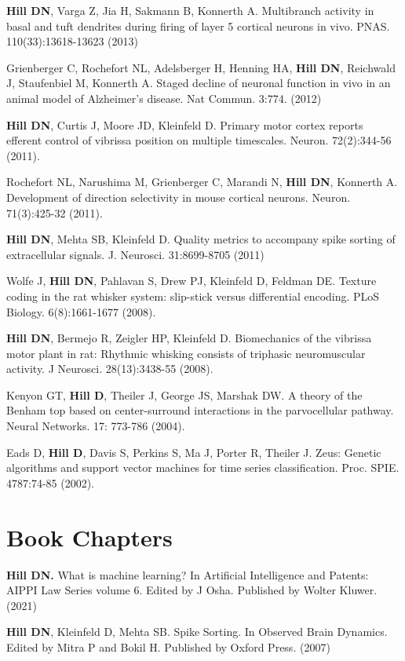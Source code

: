 \documentclass[line,11pt]{res}
\begin{document}
\begin{resume}
\textbf{Hill DN}, Varga Z, Jia H, Sakmann B, Konnerth A. Multibranch activity in basal and tuft dendrites during firing of layer 5 cortical neurons in vivo. PNAS. 110(33):13618-13623 (2013)

Grienberger C, Rochefort NL, Adelsberger H, Henning HA, \textbf{Hill DN}, Reichwald J, Staufenbiel M, Konnerth A. Staged decline of neuronal function in vivo in an animal model of Alzheimer's disease. Nat Commun. 3:774. (2012) 

\textbf{Hill DN}, Curtis J, Moore JD, Kleinfeld D.  Primary motor cortex reports efferent control of vibrissa position on multiple timescales. Neuron. 72(2):344-56 (2011).

Rochefort NL, Narushima M, Grienberger C, Marandi N, \textbf{Hill DN}, Konnerth A. Development of direction selectivity in mouse cortical neurons. Neuron. 71(3):425-32 (2011). 

\textbf{Hill DN}, Mehta SB, Kleinfeld D.  Quality metrics to accompany spike sorting of extracellular signals. J. Neurosci. 31:8699-8705 (2011)

Wolfe J, \textbf{Hill DN}, Pahlavan S, Drew PJ, Kleinfeld D, Feldman DE. Texture coding in the rat whisker system: slip-stick versus differential encoding. PLoS Biology. 6(8):1661-1677 (2008). 

\textbf{Hill DN}, Bermejo R, Zeigler HP, Kleinfeld D. Biomechanics of the vibrissa motor plant in rat: Rhythmic whisking consists of triphasic neuromuscular activity. J Neurosci. 28(13):3438-55 (2008). 

Kenyon GT, \textbf{Hill D}, Theiler J, George JS, Marshak DW. A theory of the Benham top based on center-surround interactions in the parvocellular pathway. Neural Networks. 17: 773-786 (2004). 

Eads D, \textbf{Hill D}, Davis S, Perkins S, Ma J, Porter R, Theiler J. Zeus: Genetic algorithms and support vector machines for time series classification. Proc. SPIE. 4787:74-85 (2002).

\section{Book Chapters}
\vspace{0.1in}

\textbf{Hill DN.} What is machine learning? In Artificial Intelligence and Patents: AIPPI Law Series volume 6. Edited by J Osha. Published by Wolter Kluwer. (2021)

\textbf{Hill DN}, Kleinfeld D, Mehta SB. Spike Sorting. In Observed Brain Dynamics. Edited by Mitra P and Bokil H. Published by Oxford Press. (2007)


\end{resume}
\end{document}
